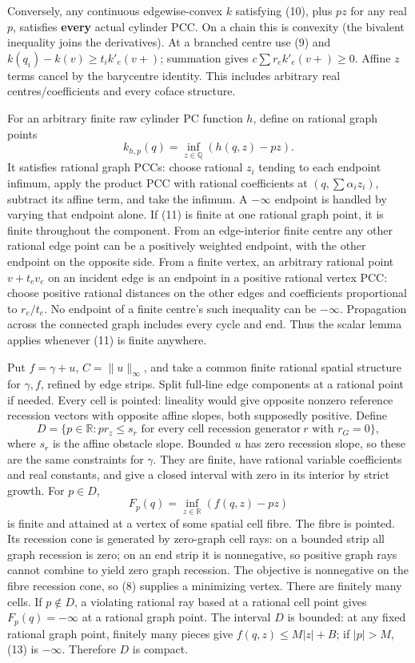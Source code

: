 \documentclass[
  11pt,
]{article}
\begin{document}
Conversely, any continuous edgewise-convex \(k\) satisfying (10), plus
\(pz\) for any real \(p\), satisfies \textbf{every} actual cylinder PCC.
On a chain this is convexity (the bivalent inequality joins the
derivatives). At a branched centre use (9) and
\(k(q_i)-k(v)\geq t_i k'_e(v+)\); summation gives
\(c\sum r_e k'_e(v+)\geq0\). Affine \(z\) terms cancel by the barycentre
identity. This includes arbitrary real centres/coefficients and every
coface structure.

For an arbitrary finite raw cylinder PC function \(h\), define on
rational graph points \[
 k_{h,p}(q)=\inf_{z\in\mathbb{Q}}(h(q,z)-pz).                 \tag{11}
\] It satisfies rational graph PCCs: choose rational \(z_i\) tending to
each endpoint infimum, apply the product PCC with rational coefficients
at \((q,\sum\alpha_i z_i)\), subtract its affine term, and take the
infimum. A \(-\infty\) endpoint is handled by varying that endpoint
alone. If (11) is finite at one rational graph point, it is finite
throughout the component. From an edge-interior finite centre any other
rational edge point can be a positively weighted endpoint, with the
other endpoint on the opposite side. From a finite vertex, an arbitrary
rational point \(v+t_ev_e\) on an incident edge is an endpoint in a
positive rational vertex PCC: choose positive rational distances on the
other edges and coefficients proportional to \(r_e/t_e\). No endpoint of
a finite centre's such inequality can be \(-\infty\). Propagation across
the connected graph includes every cycle and end. Thus the scalar lemma
applies whenever (11) is finite anywhere.

Put \(f=\gamma+u\), \(C=\|u\|_\infty\), and take a common finite
rational spatial structure for \(\gamma,f\), refined by edge strips.
Split full-line edge components at a rational point if needed. Every
cell is pointed: lineality would give opposite nonzero reference
recession vectors with opposite affine slopes, both supposedly positive.
Define \[
 D=\{p\in\mathbb{R}:p r_z\leq s_r\text{ for every cell recession generator}
                                      \ r\text{ with }r_G=0\},           \tag{12}
\] where \(s_r\) is the affine obstacle slope. Bounded \(u\) has zero
recession slope, so these are the same constraints for \(\gamma\). They
are finite, have rational variable coefficients and real constants, and
give a closed interval with zero in its interior by strict growth. For
\(p\in D\), \[
                         F_p(q)=\inf_{z\in\mathbb{R}}(f(q,z)-pz)          \tag{13}
\] is finite and attained at a vertex of some spatial cell fibre. The
fibre is pointed. Its recession cone is generated by zero-graph cell
rays: on a bounded strip all graph recession is zero; on an end strip it
is nonnegative, so positive graph rays cannot combine to yield zero
graph recession. The objective is nonnegative on the fibre recession
cone, so (8) supplies a minimizing vertex. There are finitely many
cells. If \(p\notin D\), a violating rational ray based at a rational
cell point gives \(F_p(q)=-\infty\) at a rational graph point. The
interval \(D\) is bounded: at any fixed rational graph point, finitely
many pieces give \(f(q,z)\leq M|z|+B\); if \(|p|>M\), (13) is
\(-\infty\). Therefore \(D\) is compact.
\end{document}
